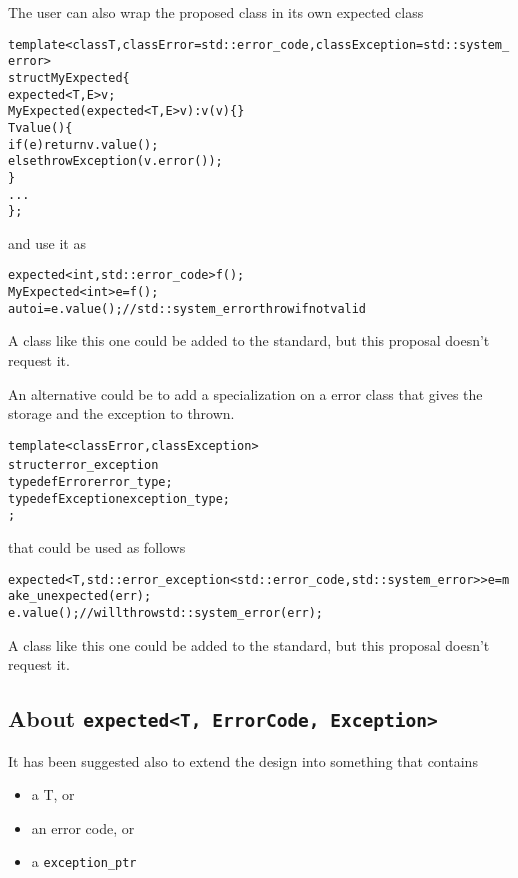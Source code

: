 \documentclass[a4paper,10pt]{article}
\newcommand{\cpp}[1]{\lstinline{#1}}
\begin{document}
The user can also wrap the proposed class in its own expected class

\begin{alltt}
template <class T, class Error=std::error_code, class Exception=std::system_error>
struct MyExpected \{
  expected <T,E> v;
  MyExpected(expected <T,E> v) : v(v) \{\}
  T value() \{  
    if (e) return v.value();
    else throw Exception(v.error());
  \}
  ...
\};
\end{alltt}

\noindent
and use it as

\begin{alltt}
expected<int, std::error_code> f();
MyExpected<int> e = f();
auto i = e.value();  // std::system_error throw if not valid
\end{alltt}

\noindent
A class like this one could be added to the standard, but this proposal doesn't request it. 

An alternative could be to add a specialization on a error class that gives the storage and the exception to thrown.

\begin{alltt}
template <class Error, class Exception>
  struct error_exception {
    typedef Error error_type;
    typedef Exception exception_type;
  };
\end{alltt}

\noindent
that could be used as follows

\begin{alltt}
expected<T, std::error_exception<std::error_code, std::system_error>> e = make_unexpected(err);
e.value(); // will throw std::system_error(err);
\end{alltt}

A class like this one could be added to the standard, but this proposal doesn't request it. 

\subsection{About \cpp{expected<T, ErrorCode, Exception>}}

It has been suggested also to extend the design into something that contains 

\begin{itemize}
\item a T, or
\item an error code, or
\item a \cpp{exception_ptr} 
\end{itemize}
\end{document}
